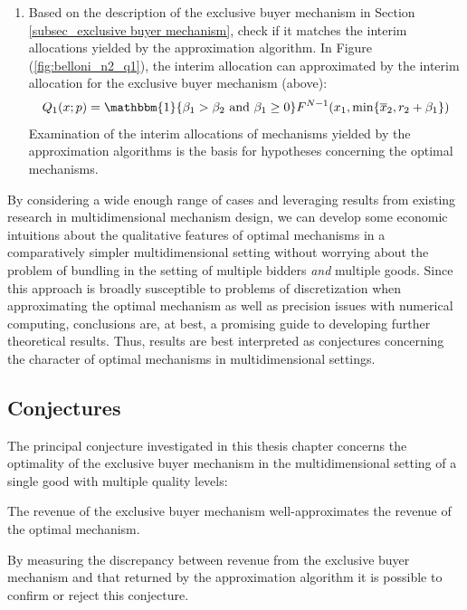 \begin{enumerate}
    \item Based on the description of the exclusive buyer mechanism in Section \ref{subsec_exclusive buyer mechanism}, check if it matches the interim allocations yielded by the approximation algorithm. In Figure (\ref{fig:belloni_n2_q1}), the interim allocation can approximated by the interim allocation for the exclusive buyer mechanism (above): 
    \begin{equation}
        Q_1(x;p) = \mathbbm{1}\{ \beta_1 > \beta_2 \text{ and } \beta_1 \geq 0 \}F^{N-1}(x_1, \min\{\overline{x}_2, r_2 + \beta_1\})
    \end{equation}
    \noindent Examination of the interim allocations of mechanisms yielded by the approximation algorithms is the basis for hypotheses concerning the optimal mechanisms.
\end{enumerate}

\noindent By considering a wide enough range of cases and leveraging results from existing research in multidimensional mechanism design, we can develop some economic intuitions about the qualitative features of optimal mechanisms in a comparatively simpler multidimensional setting without worrying about the problem of bundling in the setting of multiple bidders \textit{and} multiple goods. Since this approach is broadly susceptible to problems of discretization when approximating the optimal mechanism as well as precision issues with numerical computing, conclusions are, at best, a promising guide to developing further theoretical results. Thus, results are best interpreted as conjectures concerning the character of optimal mechanisms in multidimensional settings.




\subsection{Conjectures}\label{subsec_conj}

The principal conjecture investigated in this thesis chapter concerns the optimality of the exclusive buyer mechanism in the multidimensional setting of a single good with multiple quality levels:

\begin{conjecture}[Revenue]\label{conj_rev}
The revenue of the exclusive buyer mechanism well-approximates the revenue of the optimal mechanism.
\end{conjecture}

\noindent By measuring the discrepancy between revenue from the exclusive buyer mechanism and that returned by the approximation algorithm it is possible to confirm or reject this conjecture. 

